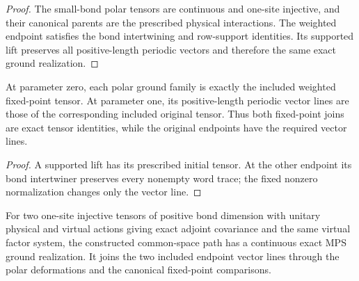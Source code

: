 \begin{proof}\leanok
    The small-bond polar tensors are continuous and one-site injective,
    and their canonical parents are the prescribed physical interactions.
    The weighted endpoint satisfies the bond intertwining and row-support
    identities. Its supported lift preserves all positive-length
    periodic vectors and therefore the same exact ground realization.
\end{proof}

\begin{lemma}
    \label{thm:spt_common_physical_polar_ground_endpoints}
    \leanok
    At parameter zero, each polar ground family is exactly the included
    weighted fixed-point tensor. At parameter one, its positive-length
    periodic vector lines are those of the corresponding included
    original tensor. Thus both fixed-point joins are exact tensor
    identities, while the original endpoints have the required vector
    lines.
\end{lemma}

\begin{proof}\leanok
    A supported lift has its prescribed initial tensor. At the other
    endpoint its bond intertwiner preserves every nonempty word trace;
    the fixed nonzero normalization changes only the vector line.
\end{proof}

\begin{definition}
    \label{def:spt_common_physical_injective_ground_path}
    \leanok
    For two one-site injective tensors of positive bond dimension with
    unitary physical and virtual actions giving exact adjoint covariance
    and the same virtual factor system, the constructed common-space
    path has a continuous exact MPS ground realization. It joins the
    two included endpoint vector lines through the polar deformations
    and the canonical fixed-point comparisons.
\end{definition}

